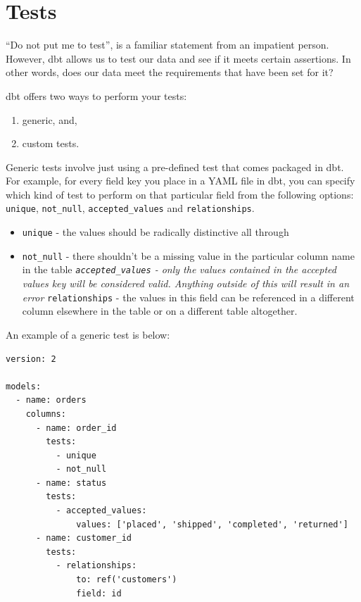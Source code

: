 \documentclass[
]{book}
\providecommand{\tightlist}{%
  \setlength{\itemsep}{0pt}\setlength{\parskip}{0pt}}
\begin{document}
\hypertarget{tests}{%
\section{Tests}\label{tests}}

``Do not put me to test'', is a familiar statement from an impatient person. However, dbt allows us to test our data and see if it meets certain assertions. In other words, does our data meet the requirements that have been set for it?

dbt offers two ways to perform your tests:

\begin{enumerate}
\def\labelenumi{\arabic{enumi}.}
\item
  generic, and,
\item
  custom tests.
\end{enumerate}

Generic tests involve just using a pre-defined test that comes packaged in dbt. For example, for every field key you place in a YAML file in dbt, you can specify which kind of test to perform on that particular field from the following options: \texttt{unique}, \texttt{not\_null}, \texttt{accepted\_values} and \texttt{relationships}.

\begin{itemize}
\tightlist
\item
  \texttt{unique} - the values should be radically distinctive all through
\item
  \texttt{not\_null} - there shouldn't be a missing value in the particular column name in the table
  \emph{\texttt{accepted\_values} - only the values contained in the accepted values key will be considered valid. Anything outside of this will result in an error
  }\texttt{relationships} - the values in this field can be referenced in a different column elsewhere in the table or on a different table altogether.
\end{itemize}

An example of a generic test is below:

\begin{verbatim}
version: 2

models:
  - name: orders
    columns:
      - name: order_id
        tests:
          - unique
          - not_null
      - name: status
        tests:
          - accepted_values:
              values: ['placed', 'shipped', 'completed', 'returned']
      - name: customer_id
        tests:
          - relationships:
              to: ref('customers')
              field: id
\end{verbatim}
\end{document}

